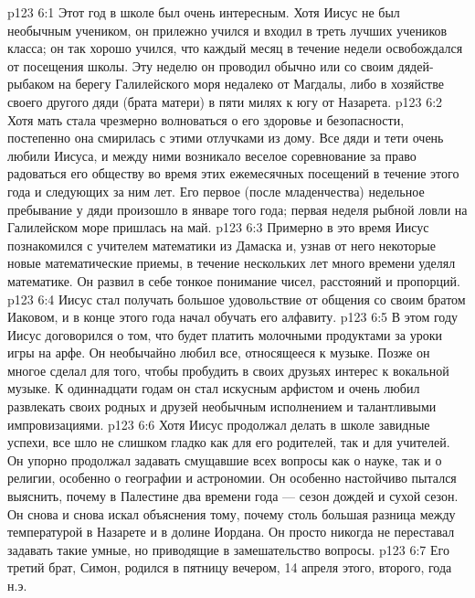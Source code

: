 \vs p123 6:1 Этот год в школе был очень интересным. Хотя Иисус не был необычным учеником, он прилежно учился и входил в треть лучших учеников класса; он так хорошо учился, что каждый месяц в течение недели освобождался от посещения школы. Эту неделю он проводил обычно или со своим дядей\hyp{}рыбаком на берегу Галилейского моря недалеко от Магдалы, либо в хозяйстве своего другого дяди (брата матери) в пяти милях к югу от Назарета.
\vs p123 6:2 Хотя мать стала чрезмерно волноваться о его здоровье и безопасности, постепенно она смирилась с этими отлучками из дому. Все дяди и тети очень любили Иисуса, и между ними возникало веселое соревнование за право радоваться его обществу во время этих ежемесячных посещений в течение этого года и следующих за ним лет. Его первое (после младенчества) недельное пребывание у дяди произошло в январе того года; первая неделя рыбной ловли на Галилейском море пришлась на май.
\vs p123 6:3 Примерно в это время Иисус познакомился с учителем математики из Дамаска и, узнав от него некоторые новые математические приемы, в течение нескольких лет много времени уделял математике. Он развил в себе тонкое понимание чисел, расстояний и пропорций.
\vs p123 6:4 Иисус стал получать большое удовольствие от общения со своим братом Иаковом, и в конце этого года начал обучать его алфавиту.
\vs p123 6:5 В этом году Иисус договорился о том, что будет платить молочными продуктами за уроки игры на арфе. Он необычайно любил все, относящееся к музыке. Позже он многое сделал для того, чтобы пробудить в своих друзьях интерес к вокальной музыке. К одиннадцати годам он стал искусным арфистом и очень любил развлекать своих родных и друзей необычным исполнением и талантливыми импровизациями.
\vs p123 6:6 Хотя Иисус продолжал делать в школе завидные успехи, все шло не слишком гладко как для его родителей, так и для учителей. Он упорно продолжал задавать смущавшие всех вопросы как о науке, так и о религии, особенно о географии и астрономии. Он особенно настойчиво пытался выяснить, почему в Палестине два времени года --- сезон дождей и сухой сезон. Он снова и снова искал объяснения тому, почему столь большая разница между температурой в Назарете и в долине Иордана. Он просто никогда не переставал задавать такие умные, но приводящие в замешательство вопросы.
\vs p123 6:7 \pc Его третий брат, Симон, родился в пятницу вечером, 14 апреля этого, второго, года н.э.
